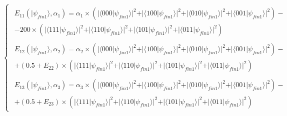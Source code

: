  \begin{equation}
 \begin{cases}
\begin{split}
E_{11}(\vert\psi_{fin1}\rangle, \alpha_{1})=\alpha_{1}\times(\vert\langle000\vert\psi_{fin1}\rangle\vert^{2} + \vert\langle100\vert\psi_{fin1}\rangle\vert^{2}
+ \vert\langle010\vert\psi_{fin1}\rangle\vert^{2}
+ \vert\langle001\vert\psi_{fin1}\rangle\vert^{2}
 ) - \\
 - 200\times(\vert\langle111\vert\psi_{fin1}\rangle\vert^{2} + \vert\langle110\vert\psi_{fin1}\rangle\vert^{2}
+ \vert\langle101\vert\psi_{fin1}\rangle\vert^{2}
+ \vert\langle011\vert\psi_{fin1}\rangle\vert^{2}
 )
\end{split}
\\
\begin{split}
E_{12}(\vert\psi_{fin1}\rangle, \alpha_{2})=\alpha_{2}\times(\vert\langle000\vert\psi_{fin1}\rangle\vert^{2} + \vert\langle100\vert\psi_{fin1}\rangle\vert^{2}
+ \vert\langle010\vert\psi_{fin1}\rangle\vert^{2}
+ \vert\langle001\vert\psi_{fin1}\rangle\vert^{2}
 ) - \\
 + (0.5 + E_{22})\times(\vert\langle111\vert\psi_{fin1}\rangle\vert^{2} + \vert\langle110\vert\psi_{fin1}\rangle\vert^{2}
+ \vert\langle101\vert\psi_{fin1}\rangle\vert^{2}
+ \vert\langle011\vert\psi_{fin1}\rangle\vert^{2}
 )
\end{split}
\\
\begin{split}
E_{13}(\vert\psi_{fin1}\rangle, \alpha_{3})=\alpha_{3}\times(\vert\langle000\vert\psi_{fin1}\rangle\vert^{2} + \vert\langle100\vert\psi_{fin1}\rangle\vert^{2}
+ \vert\langle010\vert\psi_{fin1}\rangle\vert^{2}
+ \vert\langle001\vert\psi_{fin1}\rangle\vert^{2}
 ) - \\
 + (0.5 + E_{23})\times(\vert\langle111\vert\psi_{fin1}\rangle\vert^{2} + \vert\langle110\vert\psi_{fin1}\rangle\vert^{2}
+ \vert\langle101\vert\psi_{fin1}\rangle\vert^{2}
+ \vert\langle011\vert\psi_{fin1}\rangle\vert^{2}
 )
\end{split}
\end{cases}
\label{eq:pirates_payoff32}
\end{equation}

